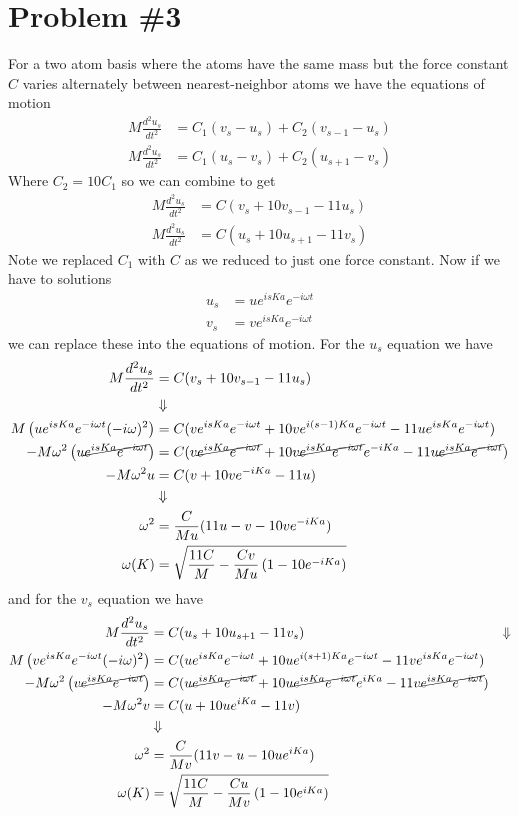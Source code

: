 \documentclass[11pt]{article}
\numberwithin{equation}{section}
\begin{document}
\section{Problem \#3}
For a two atom basis where the atoms have the same mass but the force constant $C$ varies alternately between nearest-neighbor atoms we have the equations of motion 
\begin{align*}
M\frac{d^2u_s}{dt^2} &= C_1(v_s - u_s) + C_2(v_{s-1} - u_s)\\
M\frac{d^2u_s}{dt^2} &= C_1(u_s - v_s) + C_2(u_{s+1} - v_s)
\end{align*}
Where $C_2 = 10C_1$ so we can combine to get
\begin{align*}
M\frac{d^2u_s}{dt^2} &= C(v_s + 10v_{s-1} - 11u_s)\\
M\frac{d^2u_s}{dt^2} &= C(u_{s} + 10u_{s+1} - 11v_s)
\end{align*}
Note we replaced $C_1$ with $C$ as we reduced to just one force constant. Now if we have to solutions 
\begin{align*}
u_s &= ue^{isKa}e^{-i\omega t}\\
v_s &= ve^{isKa}e^{-i\omega t}
\end{align*}
we can replace these into the equations of motion. For the $u_s$ equation we have
\begin{align*}
M\frac{d^2u_s}{dt^2} &= C(v_s + 10v_{s-1} - 11u_s)\\
&\Downarrow\\
M\left(ue^{isKa}e^{-i\omega t}(-i\omega)^2\right) &= C(ve^{isKa}e^{-i\omega t} + 10ve^{i(s-1)Ka}e^{-i\omega t} - 11ue^{isKa}e^{-i\omega t})\\
-M\omega^2\left(u\cancel{e^{isKa}e^{-i\omega t}}\right) &= C(v\cancel{e^{isKa}e^{-i\omega t}} + 10v\cancel{e^{isKa}e^{-i\omega t}}e^{-iKa} - 11u\cancel{e^{isKa}e^{-i\omega t}})\\
-M\omega^2u &= C(v + 10ve^{-iKa} - 11u)\\
&\Downarrow\\
\omega^2 &= \frac{C}{Mu}(11u -v - 10ve^{-iKa})\\
\omega(K) &= \sqrt{\frac{11C}{M} -\frac{Cv}{Mu}\left(1 - 10e^{-iKa}\right)}
\end{align*}
and for the $v_s$ equation we have
\begin{align*}
M\frac{d^2u_s}{dt^2} &= C(u_{s} + 10u_{s+1} - 11v_s)
&\Downarrow\\
M\left(ve^{isKa}e^{-i\omega t}(-i\omega)^2\right) &= C(ue^{isKa}e^{-i\omega t} + 10ue^{i(s+1)Ka}e^{-i\omega t} - 11ve^{isKa}e^{-i\omega t})\\
-M\omega^2\left(v\cancel{e^{isKa}e^{-i\omega t}}\right) &= C(u\cancel{e^{isKa}e^{-i\omega t}} + 10u\cancel{e^{isKa}e^{-i\omega t}}e^{iKa} - 11v\cancel{e^{isKa}e^{-i\omega t}})\\
-M\omega^2v &= C(u + 10ue^{iKa} - 11v)\\
&\Downarrow\\
\omega^2 &= \frac{C}{Mv}(11v - u - 10ue^{iKa})\\
\omega(K) &= \sqrt{\frac{11C}{M} - \frac{Cu}{Mv}\left(1 - 10e^{iKa}\right)}
\end{align*}
\end{document}
